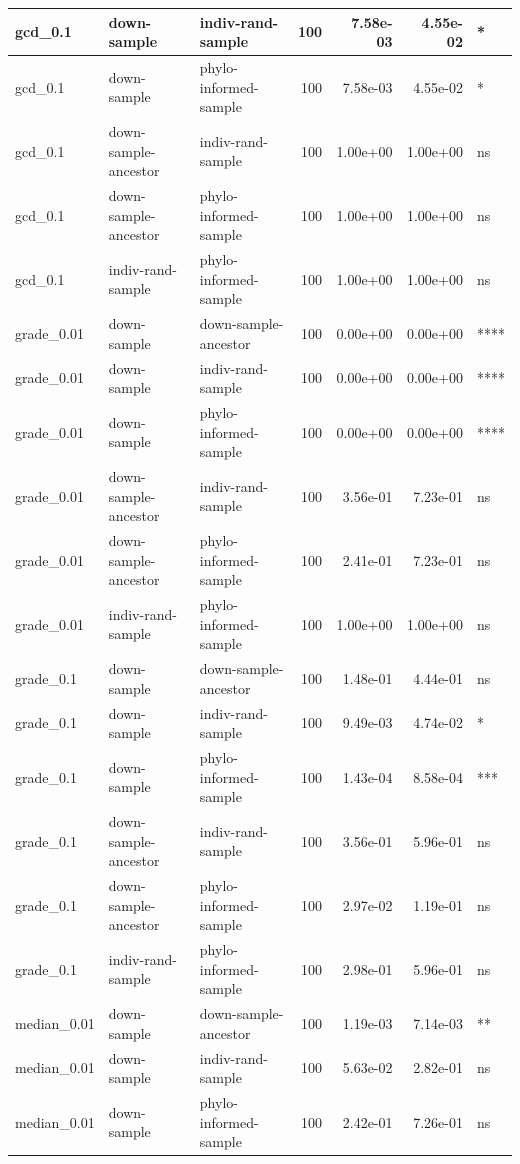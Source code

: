 \documentclass[
]{book}
\begin{document}
\begin{table}
\begin{tabular}[t]{l|l|l|r|r|r|l}
\hline
gcd\_0.1 & down-sample & indiv-rand-sample & 100 & 7.58e-03 & 4.55e-02 & *\\
\hline
gcd\_0.1 & down-sample & phylo-informed-sample & 100 & 7.58e-03 & 4.55e-02 & *\\
\hline
gcd\_0.1 & down-sample-ancestor & indiv-rand-sample & 100 & 1.00e+00 & 1.00e+00 & ns\\
\hline
gcd\_0.1 & down-sample-ancestor & phylo-informed-sample & 100 & 1.00e+00 & 1.00e+00 & ns\\
\hline
gcd\_0.1 & indiv-rand-sample & phylo-informed-sample & 100 & 1.00e+00 & 1.00e+00 & ns\\
\hline
grade\_0.01 & down-sample & down-sample-ancestor & 100 & 0.00e+00 & 0.00e+00 & ****\\
\hline
grade\_0.01 & down-sample & indiv-rand-sample & 100 & 0.00e+00 & 0.00e+00 & ****\\
\hline
grade\_0.01 & down-sample & phylo-informed-sample & 100 & 0.00e+00 & 0.00e+00 & ****\\
\hline
grade\_0.01 & down-sample-ancestor & indiv-rand-sample & 100 & 3.56e-01 & 7.23e-01 & ns\\
\hline
grade\_0.01 & down-sample-ancestor & phylo-informed-sample & 100 & 2.41e-01 & 7.23e-01 & ns\\
\hline
grade\_0.01 & indiv-rand-sample & phylo-informed-sample & 100 & 1.00e+00 & 1.00e+00 & ns\\
\hline
grade\_0.1 & down-sample & down-sample-ancestor & 100 & 1.48e-01 & 4.44e-01 & ns\\
\hline
grade\_0.1 & down-sample & indiv-rand-sample & 100 & 9.49e-03 & 4.74e-02 & *\\
\hline
grade\_0.1 & down-sample & phylo-informed-sample & 100 & 1.43e-04 & 8.58e-04 & ***\\
\hline
grade\_0.1 & down-sample-ancestor & indiv-rand-sample & 100 & 3.56e-01 & 5.96e-01 & ns\\
\hline
grade\_0.1 & down-sample-ancestor & phylo-informed-sample & 100 & 2.97e-02 & 1.19e-01 & ns\\
\hline
grade\_0.1 & indiv-rand-sample & phylo-informed-sample & 100 & 2.98e-01 & 5.96e-01 & ns\\
\hline
median\_0.01 & down-sample & down-sample-ancestor & 100 & 1.19e-03 & 7.14e-03 & **\\
\hline
median\_0.01 & down-sample & indiv-rand-sample & 100 & 5.63e-02 & 2.82e-01 & ns\\
\hline
median\_0.01 & down-sample & phylo-informed-sample & 100 & 2.42e-01 & 7.26e-01 & ns\\

\end{tabular}
\end{table}
\end{document}
